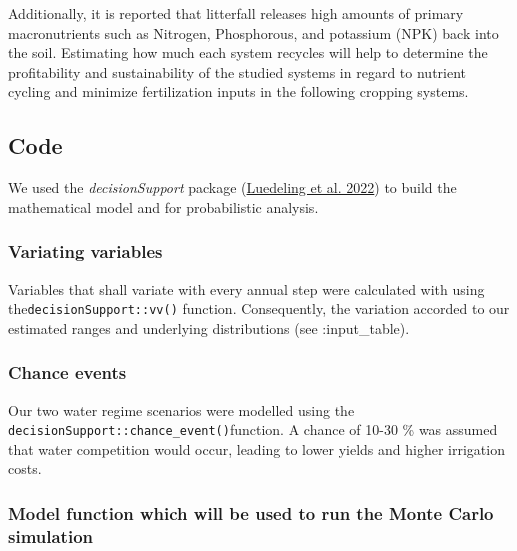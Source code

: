 \documentclass[
]{article}
\begin{document}
Additionally, it is reported that litterfall releases high amounts of primary macronutrients such as Nitrogen, Phosphorous, and potassium (NPK) back into the soil. Estimating how much each system recycles will help to determine the profitability and sustainability of the studied systems in regard to nutrient cycling and minimize fertilization inputs in the following cropping systems.

\hypertarget{code}{%
\subsection{Code}\label{code}}

We used the \emph{decisionSupport} package (\protect\hyperlink{ref-R-decisionSupport}{Luedeling et al. 2022}) to build the mathematical model and for probabilistic analysis.

\hypertarget{variating-variables}{%
\subsubsection{Variating variables}\label{variating-variables}}

Variables that shall variate with every annual step were calculated with using the\texttt{decisionSupport::vv()} function. Consequently, the variation accorded to our estimated ranges and underlying distributions (see \tab:input\_table).

\hypertarget{chance-events}{%
\subsubsection{Chance events}\label{chance-events}}

Our two water regime scenarios were modelled using the \texttt{decisionSupport::chance\_event()}function. A chance of 10-30 \% was assumed that water competition would occur, leading to lower yields and higher irrigation costs.

\hypertarget{model-function-which-will-be-used-to-run-the-monte-carlo-simulation}{%
\subsubsection{Model function which will be used to run the Monte Carlo simulation}\label{model-function-which-will-be-used-to-run-the-monte-carlo-simulation}}
\end{document}

